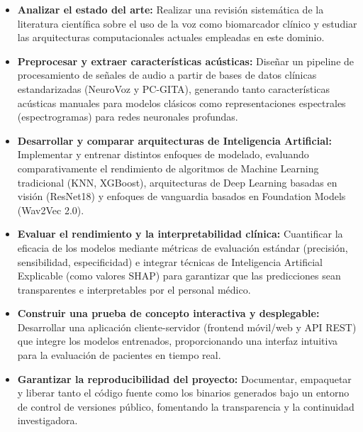 \begin{itemize}
    \item \textbf{Analizar el estado del arte:} Realizar una revisión sistemática de la literatura científica sobre el uso de la voz como biomarcador clínico y estudiar las arquitecturas computacionales actuales empleadas en este dominio.
    
    \item \textbf{Preprocesar y extraer características acústicas:} Diseñar un pipeline de procesamiento de señales de audio a partir de bases de datos clínicas estandarizadas (NeuroVoz y PC-GITA), generando tanto características acústicas manuales para modelos clásicos como representaciones espectrales (espectrogramas) para redes neuronales profundas.
    
    \item \textbf{Desarrollar y comparar arquitecturas de Inteligencia Artificial:} Implementar y entrenar distintos enfoques de modelado, evaluando comparativamente el rendimiento de algoritmos de Machine Learning tradicional (KNN, XGBoost), arquitecturas de Deep Learning basadas en visión (ResNet18) y enfoques de vanguardia basados en Foundation Models (Wav2Vec 2.0).
    
    \item \textbf{Evaluar el rendimiento y la interpretabilidad clínica:} Cuantificar la eficacia de los modelos mediante métricas de evaluación estándar (precisión, sensibilidad, especificidad) e integrar técnicas de Inteligencia Artificial Explicable (como valores SHAP) para garantizar que las predicciones sean transparentes e interpretables por el personal médico.
    
    \item \textbf{Construir una prueba de concepto interactiva y desplegable:} Desarrollar una aplicación cliente-servidor (frontend móvil/web y API REST) que integre los modelos entrenados, proporcionando una interfaz intuitiva para la evaluación de pacientes en tiempo real.
    
    \item \textbf{Garantizar la reproducibilidad del proyecto:} Documentar, empaquetar y liberar tanto el código fuente como los binarios generados bajo un entorno de control de versiones público, fomentando la transparencia y la continuidad investigadora.
\end{itemize}